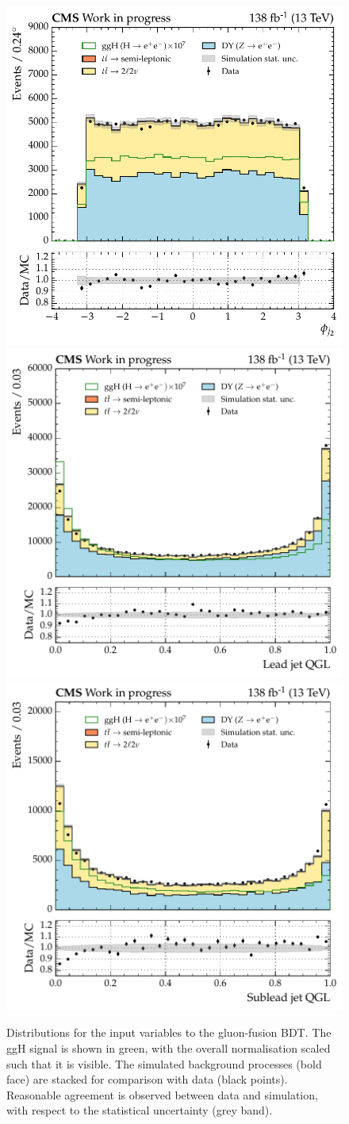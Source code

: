 \begin{figure}[htbp!]
\includegraphics[width =0.33\linewidth]{Figures/Hee/ggH/dataMC/all_inputs/ggH_BDT_pt_reweighted_subleadJetPhi.pdf}\hfill%
\includegraphics[width =0.33\linewidth]{Figures/Hee/ggH/dataMC/all_inputs/ggH_BDT_pt_reweighted_leadJetQGL.pdf}\hfill%
\includegraphics[width =0.33\linewidth]{Figures/Hee/ggH/dataMC/all_inputs/ggH_BDT_pt_reweighted_subleadJetQGL.pdf}\hfill%
 
\caption{Distributions for the input variables to the gluon-fusion BDT. The ggH signal is shown in green, with the overall normalisation scaled such that it is visible. The simulated background processes (bold face) are stacked for comparison with data (black points). Reasonable agreement is observed between data and simulation, with respect to the statistical uncertainty (grey band).}
\label{fig:ggH_inputs_last}
\end{figure}




